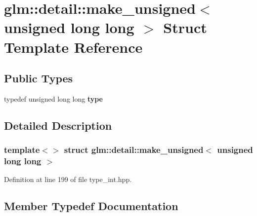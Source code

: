 \hypertarget{structglm_1_1detail_1_1make__unsigned_3_01unsigned_01long_01long_01_4}{}\section{glm\+:\+:detail\+:\+:make\+\_\+unsigned$<$ unsigned long long $>$ Struct Template Reference}
\label{structglm_1_1detail_1_1make__unsigned_3_01unsigned_01long_01long_01_4}
\subsection*{Public Types}
\begin{DoxyCompactItemize}
\item 
\mbox{\label{structglm_1_1detail_1_1make__unsigned_3_01unsigned_01long_01long_01_4_a3f3f1eb1cbdd286e6cb4afb5fa71d5c7}} 
typedef unsigned long long {\bfseries type}
\end{DoxyCompactItemize}


\subsection{Detailed Description}
\subsubsection*{template$<$$>$\newline
struct glm\+::detail\+::make\+\_\+unsigned$<$ unsigned long long $>$}



Definition at line 199 of file type\+\_\+int.\+hpp.



\subsection{Member Typedef Documentation}
\mbox{\label{structglm_1_1detail_1_1make__unsigned_3_01unsigned_01long_01long_01_4_a3f3f1eb1cbdd286e6cb4afb5fa71d5c7}} 
